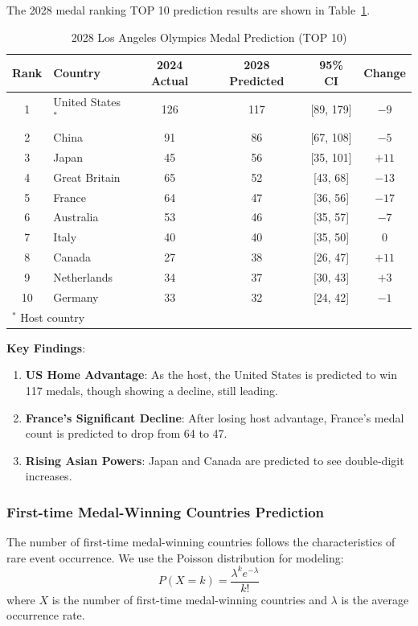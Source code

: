 \documentclass{mcmthesis}
\begin{document}
The 2028 medal ranking TOP 10 prediction results are shown in Table~\ref{tab:2028_prediction}.

\begin{table}[htbp]
\centering
\caption{2028 Los Angeles Olympics Medal Prediction (TOP 10)}
\label{tab:2028_prediction}
\begin{tabular}{clcccc}
\toprule
\textbf{Rank} & \textbf{Country} & \textbf{2024 Actual} & \textbf{2028 Predicted} & \textbf{95\% CI} & \textbf{Change} \\
\midrule
1 & United States$^*$ & 126 & 117 & [89, 179] & $-9$ \\
2 & China & 91 & 86 & [67, 108] & $-5$ \\
3 & Japan & 45 & 56 & [35, 101] & $+11$ \\
4 & Great Britain & 65 & 52 & [43, 68] & $-13$ \\
5 & France & 64 & 47 & [36, 56] & $-17$ \\
6 & Australia & 53 & 46 & [35, 57] & $-7$ \\
7 & Italy & 40 & 40 & [35, 50] & $0$ \\
8 & Canada & 27 & 38 & [26, 47] & $+11$ \\
9 & Netherlands & 34 & 37 & [30, 43] & $+3$ \\
10 & Germany & 33 & 32 & [24, 42] & $-1$ \\
\bottomrule
\multicolumn{6}{l}{\footnotesize $^*$ Host country} \\
\end{tabular}
\end{table}

\textbf{Key Findings}:
\begin{enumerate}
    \item \textbf{US Home Advantage}: As the host, the United States is predicted to win 117 medals, though showing a decline, still leading.
    \item \textbf{France's Significant Decline}: After losing host advantage, France's medal count is predicted to drop from 64 to 47.
    \item \textbf{Rising Asian Powers}: Japan and Canada are predicted to see double-digit increases.
\end{enumerate}

\subsubsection{First-time Medal-Winning Countries Prediction}

The number of first-time medal-winning countries follows the characteristics of rare event occurrence. We use the Poisson distribution for modeling:
\begin{equation}
    P(X = k) = \frac{\lambda^k e^{-\lambda}}{k!}
\end{equation}
where $X$ is the number of first-time medal-winning countries and $\lambda$ is the average occurrence rate.
\end{document}
